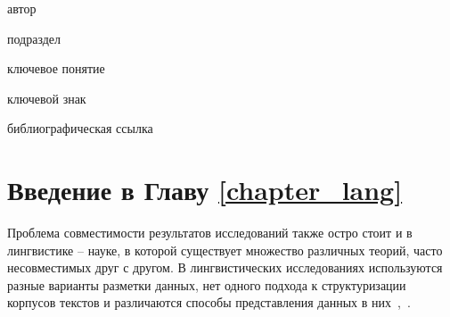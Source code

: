 \begin{SCn}
    \begin{scnrelfromlist}{автор}
    \end{scnrelfromlist}

    \bigskip


    \bigskip

    \begin{scnrelfromlist}{подраздел}
    \end{scnrelfromlist}

    \bigskip

    \begin{scnrelfromlist}{ключевое понятие}
    \end{scnrelfromlist}

    \begin{scnrelfromlist}{ключевой знак}
    \end{scnrelfromlist}

    \bigskip

    \begin{scnrelfromlist}{библиографическая ссылка}
    \end{scnrelfromlist}

\end{SCn}

\section*{Введение в Главу \ref{chapter_lang}}

Проблема совместимости результатов исследований также остро стоит и в лингвистике -- науке, в которой существует множество различных теорий, часто несовместимых друг с другом.
В лингвистических исследованиях используются разные варианты разметки данных, нет одного подхода к структуризации корпусов текстов и различаются способы представления данных в них~\cite{Farrar2002ACO},~\cite{Chiarcos2012}.

